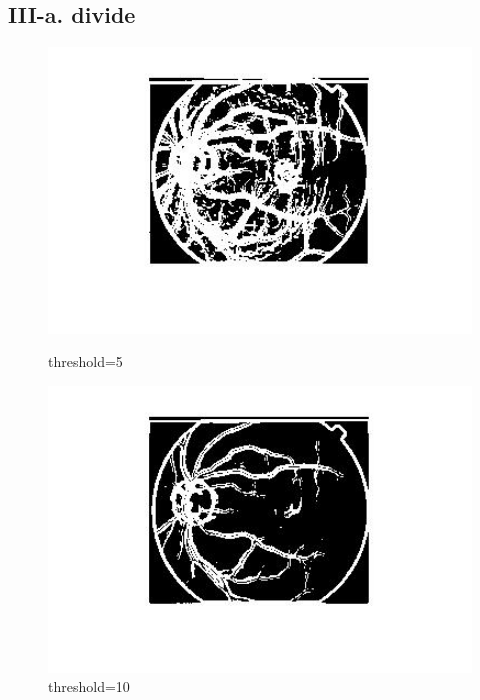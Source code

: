 \documentclass[twoside,a4paper]{article}
\begin{document}
\subsection*{III-a. divide}
\begin{figure}[H]
\centering
\includegraphics[width=6in]{divide.jpg}
\caption{threshold=5}
\includegraphics[width=6in]{divide10.jpg}
\caption{threshold=10}
\end{figure}
\end{document}
